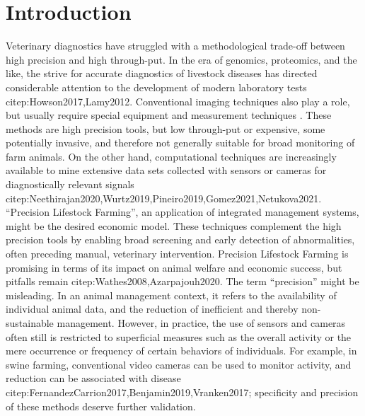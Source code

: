 \section{Introduction}
\label{intro}
Veterinary diagnostics have struggled with a methodological trade-off between high precision and high through-put.
In the era of genomics, proteomics, and the like, the strive for accurate diagnostics of livestock diseases has directed considerable attention to the development of modern laboratory tests citep:Howson2017,Lamy2012.
Conventional imaging techniques also play a role, but usually require special equipment and measurement techniques \citep[e.g. radiography, microscopy, ultrasound, \textit{cf.}][]{Yitbarek2022}.
These methods are high precision tools, but low through-put or expensive, some potentially invasive, and therefore not generally suitable for broad monitoring of farm animals.
On the other hand, computational techniques are increasingly available to mine extensive data sets collected with sensors or cameras for diagnostically relevant signals citep:Neethirajan2020,Wurtz2019,Pineiro2019,Gomez2021,Netukova2021.
``Precision Lifestock Farming'', an application of integrated management systems, might be the desired economic model.
These techniques complement the high precision tools by enabling broad screening and early detection of abnormalities, often preceding manual, veterinary intervention.
Precision Lifestock Farming is promising in terms of its impact on animal welfare and economic success, but pitfalls remain citep:Wathes2008,Azarpajouh2020.
The term ``precision'' might be misleading.
In an animal management context, it refers to the availability of individual animal data, and the reduction of inefficient and thereby non-sustainable management.
However, in practice, the use of sensors and cameras often still is restricted to superficial measures such as the overall activity or the mere occurrence or frequency of certain behaviors of individuals.
For example, in swine farming, conventional video cameras can be used to monitor activity, and reduction can be associated with disease citep:FernandezCarrion2017,Benjamin2019,Vranken2017; specificity and precision of these methods deserve further validation.


